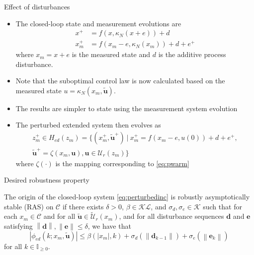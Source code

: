 \documentclass{beamer}
\newcommand{\abs}[1]{\left\lvert #1 \right\rvert}
\newcommand{\norm}[1]{\left\lvert #1 \right\rvert}
\newcommand{\smax}[1]{\left\lVert #1 \right\rVert}
\begin{document}
\begin{frame}{Effect of disturbances}

\begin{itemize}

\item The closed-loop state and measurement evolutions are
\begin{align*}
x^+ &= f(x,\kappa_N(x+e)) + d \\
x_m^+ &= f(x_m-e, \kappa_N(x_m)) + d + e^+
\end{align*}
where $x_m = x+e$ is the measured state and $d$ is the additive
process disturbance. 

\item Note that the suboptimal control 
law is now calculated based on the measured state $u =
\kappa_N(x_m,\tilde{\mathbf{u}})$. 

\item The results are simpler to state using the measurement system evolution

\item The perturbed extended system then evolves as
\begin{multline}
z_m^+ \in H_{ed}(z_m) = \{(x_m^+,\tilde{\mathbf{u}}^+) \ | \ x_m^+ =
f(x_m-e,u(0))+d+e^+, \\
\tilde{\mathbf{u}}^+ = \zeta(x_m,\mathbf{u}), \mathbf{u} \in \mathcal{U}_r(z_m)\}
\label{eq:perturbedinc}
\end{multline}
where $\zeta(\cdot)$ is the mapping corresponding to \eqref{eq:pwarm} 

\end{itemize}
\end{frame}


\begin{frame}{Desired robustness property}
\begin{definition}
\label{def:ras}
The origin of the closed-loop system \eqref{eq:perturbedinc} is
robustly asymptotically stable (RAS) on $\mathcal{C}$
if there exists $\delta > 0$, 
$\beta \in \mathcal{KL}$, and $\sigma_d,\sigma_e \in \mathcal{K}$ such that
for each $x_m \in \mathcal{C}$ and for all $\tilde{\mathbf{u}} \in
\tilde{\mathcal{U}}_r(x_m)$,  and for all disturbance sequences
$\mathbf{d}$ and $\mathbf{e}$ 
satisfying $\smax{\mathbf{d}},\smax{\mathbf{e}} \leq \delta$, 
we have that
\begin{equation}
\label{eq:ras}
\abs{\phi_{ed}(k;x_m,\tilde{\mathbf{u}})} \leq \beta(\abs{x_m},k) + \sigma_d(\smax{
\mathbf{d}_{k-1}})+ \sigma_e(\smax{\mathbf{e}_k})
\end{equation}
for all $k \in \mathbb{I}_{\geq 0}$.
\end{definition}
\end{frame}
\end{document}
